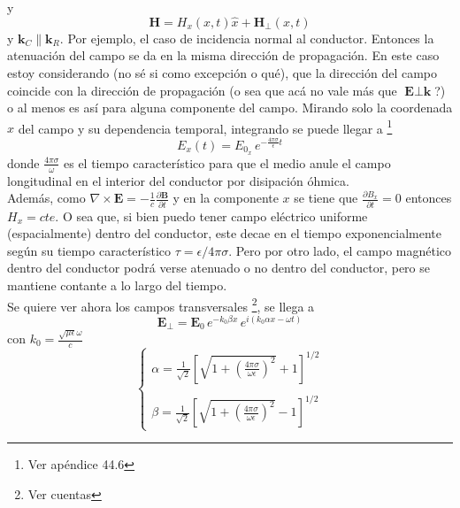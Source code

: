 y
\begin{equation*}
    \textbf{H} = H_{x}(x,t)\hat{x} + \textbf{H}_{\perp}(x,t)
\end{equation*}
y $\textbf{k}_{C}\parallel \textbf{k}_{R}$. Por ejemplo, el caso de incidencia normal al conductor. Entonces la atenuación del campo se da en la misma dirección de propagación. En este caso estoy considerando (no sé si como excepción o qué), que la dirección del campo coincide con la dirección de propagación (o sea que acá no vale más que $\textbf{E} \perp \textbf{k}$?) o al menos es así para alguna componente del campo. Mirando solo la coordenada $x$ del campo y su dependencia temporal, integrando se puede llegar a \footnote{Ver apéndice 44.6}
\begin{equation*}
    E_{x}(t) = E_{0_{x}}\,e^{-\frac{4\pi\sigma}{\epsilon}t}
\end{equation*}
donde $\frac{4\pi\sigma}{\omega}$ es el tiempo característico para que el medio anule el campo longitudinal en el interior del conductor por disipación óhmica.\\
\indent Además, como $\nabla \times \textbf{E} = -\frac{1}{c}\frac{\partial \textbf{B}}{\partial t}$ y en la componente $x$ se tiene que $\frac{\partial B_{x}}{\partial t} = 0$ entonces $H_{x} = cte$. O sea que, si bien puedo tener campo eléctrico uniforme (espacialmente) dentro del conductor, este decae en el tiempo exponencialmente según su tiempo característico $\tau = \epsilon/4\pi\sigma$. Pero por otro lado, el campo magnético dentro del conductor podrá verse atenuado o no dentro del conductor, pero se mantiene contante a lo largo del tiempo.\\
\indent Se quiere ver ahora los campos transversales \footnote{Ver cuentas}, se llega a 
\begin{equation*}
    \textbf{E}_{\perp} 
    = \textbf{E}_{0}\,e^{-k_{0}\beta x}\,
    e^{i(k_{0}\alpha x - \omega t)}
\end{equation*}
con $k_{0} = \frac{\sqrt{\mu\epsilon}\omega}{c}$
\begin{equation*}
    \left\{
        \begin{matrix}
            \alpha = \frac{1}{\sqrt{2}}
            \left[
                \sqrt{1 + 
                \left(
                    \frac{4\pi\sigma}{\omega \epsilon}
                \right)^{2}} +1
            \right]^{1/2}\\
            \\
            \beta = \frac{1}{\sqrt{2}}
            \left[
                \sqrt{1 + 
                \left(
                    \frac{4\pi\sigma}{\omega \epsilon}
                \right)^{2}}  - 1
            \right]^{1/2}
        \end{matrix}
    \right.
\end{equation*}


